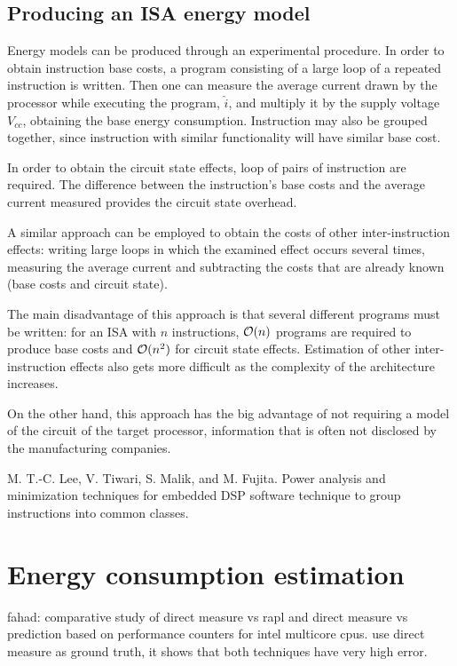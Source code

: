 \subsection{Producing an ISA energy model}
Energy models can be produced through an experimental procedure. \newline
In order to obtain instruction base costs, a program consisting of a large loop of a repeated instruction is written. Then one can measure the average current drawn by the processor while executing the program, $\hat{i}$, and multiply it by the supply voltage $V_{cc}$, obtaining the base energy consumption. \newline
Instruction may also be grouped together, since instruction with similar functionality will have similar base cost.\par 
In order to obtain the circuit state effects, loop of pairs of instruction are required. The difference between the instruction's base costs and the average current measured provides the circuit state overhead. \par 
A similar approach can be employed to obtain the costs of other inter-instruction effects: writing large loops in which the examined effect occurs several times, measuring the average current and subtracting the costs that are already known (base costs and circuit state). \par 
The main disadvantage of this approach is that several different programs must be written: for an ISA with $n$ instructions, $\mathcal{O}(n)$ programs are required to produce base costs and $\mathcal{O}(n^{2})$ for circuit state effects. \newline
Estimation of other inter-instruction effects also gets more difficult as the complexity of the architecture increases. \par
On the other hand, this approach has the big advantage of not requiring a model of the circuit of the target processor, information that is often not disclosed by the manufacturing companies.

 M. T.-C. Lee, V. Tiwari, S. Malik, and M. Fujita.
Power analysis and minimization techniques for
embedded DSP software 
technique to group instructions into common classes.

\section{Energy consumption estimation}
fahad: comparative study of direct measure vs rapl and direct measure vs prediction based on performance counters for intel multicore cpus.
use direct measure as ground truth, it shows that both techniques have very high error.

